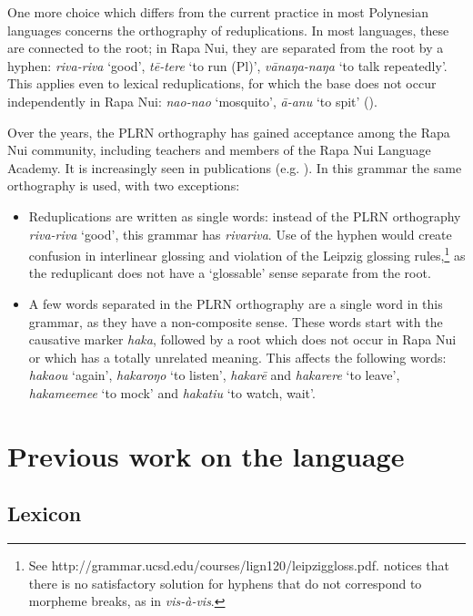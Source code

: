 One more choice which differs from the current practice in most Polynesian languages concerns the orthography of reduplications. In most languages, these are connected to the root; in Rapa Nui, they are separated from the root by a hyphen: \textit{\mbox{riva-riva}} ‘good’, \textit{\mbox{tē-tere}} ‘to run (Pl)’, \textit{\mbox{vānaŋa-naŋa}} ‘to talk repeatedly’. This applies even to lexical reduplications, for which the base does not occur independently in Rapa Nui: \textit{\mbox{nao-nao}} ‘mosquito’, \textit{\mbox{{\ꞌ}ā-{\ꞌ}anu}} ‘to spit’ (). 

Over the years, the PLRN orthography has gained acceptance among the Rapa Nui community, including teachers and members of the Rapa Nui Language Academy. It is increasingly seen in publications (e.g. \citealt{GleisnerMontt2014}). In this grammar the same orthography is used, with two exceptions:

\begin{itemize}
\item 
Reduplications are written as single words: instead of the PLRN orthography \textit{\mbox{riva-riva}} ‘good’, this grammar has \textit{rivariva}. Use of the hyphen would create confusion in interlinear glossing and violation of the Leipzig glossing rules,\footnote{\label{fn:23}See http://grammar.ucsd.edu/courses/lign120/leipziggloss.pdf. \citet{Lehmann2004} notices that there is no satisfactory solution for hyphens that do not correspond to morpheme breaks, as in \textit{vis-à-vis}.} as the reduplicant does not have a ‘glossable’ sense separate from the root.

\item 
A few words separated in the PLRN orthography are a single word in this grammar, as they have a non-composite sense. These words start with the causative marker \textit{haka}, followed by a root which does not occur in Rapa Nui or which has a totally unrelated meaning. This affects the following words: \textit{haka{\ꞌ}ou} ‘again’, \textit{hakaroŋo} ‘to listen’, \textit{hakarē} and \textit{hakarere} ‘to leave’, \textit{hakame{\ꞌ}eme{\ꞌ}e} ‘to mock’ and \textit{hakatiu} ‘to watch, wait’. 

\end{itemize}

\section{Previous work on the language}\label{sec:1.5}
\subsection{Lexicon}\label{sec:1.5.1}

